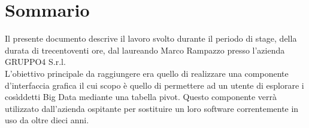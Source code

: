 
\cleardoublepage
{}
{}
\begingroup
\let\clearpage\relax
\let\cleardoublepage\relax
\let\cleardoublepage\relax

\chapter*{Sommario}

Il presente documento descrive il lavoro svolto durante il periodo di stage, della durata di trecentoventi ore, dal laureando Marco Rampazzo presso l'azienda GRUPPO4 S.r.l. \\
L'obiettivo principale da raggiungere era quello di realizzare una componente d'interfaccia grafica il cui scopo è quello di permettere ad un utente di esplorare i cosìddetti Big Data mediante una tabella pivot. Questo componente verrà utilizzato dall'azienda ospitante per sostituire un loro software correntemente in uso da oltre dieci anni. 

%
%

\endgroup			

\vfill

